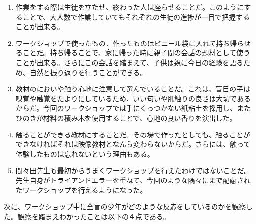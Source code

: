 \documentclass[openany,11pt,papersize]{jsbook}
\begin{document}
\begin{enumerate}
\item 作業をする際は生徒を立たせ、終わった人は座らせることだ。このようにすることで、大人数で作業していてもそれぞれの生徒の進捗が一目で把握することが出来る。
\item ワークショップで使ったもの、作ったものはビニール袋に入れて持ち帰らせることだ。持ち帰ることで、家に帰った時に親子間の会話の題材として使うことが出来る。さらにこの会話を踏まえて、子供は親に今日の経験を語るため、自然と振り返りを行うことができる。
\item 教材のにおいや触り心地に注意して選んでいることだ。これは、盲目の子は嗅覚や触覚をたよりにしているため、いい匂いや肌触りの良さは大切であるからだ。今回のワークショップでは手にくっつかない紙粘土を採用し、またひのきが材料の積み木を使用することで、心地の良い香りを演出した。
\item 触ることができる教材にすることだ。その場で作ったとしても、触ることができなければそれは映像教材となんら変わらないからだ。さらには、触って体験したものは忘れないという理由もある。
\item 間々田先生も最初からうまくワークショップを行えたわけではないことだ。先生自身がトライアンドエラーを重ねて、今回のような隅々にまで配慮されたワークショップを行えるようになった。
\end{enumerate}

\par 次に、ワークショップ中に全盲の少年がどのような反応をしているのかを観察した。観察を踏まえわかったことは以下の４点である。
\end{document}
